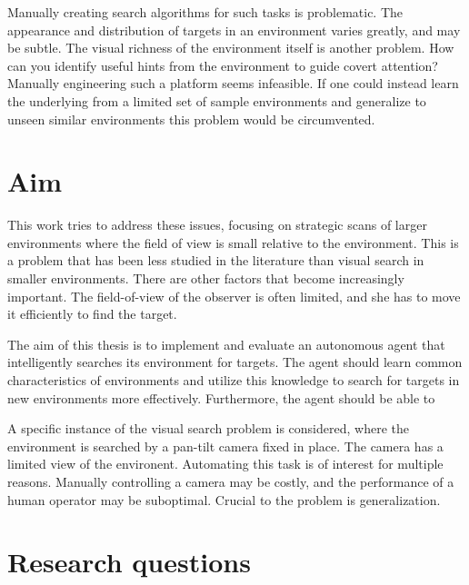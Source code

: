 Manually creating search algorithms for such tasks is problematic. The appearance and distribution of targets in an environment varies greatly, and may be subtle. The visual richness of the environment itself is another problem. How can you identify useful hints from the environment to guide covert attention? Manually engineering such a platform seems infeasible. If one could instead learn the underlying from a limited set of sample environments and generalize to unseen similar environments this problem would be circumvented.





\section{Aim}
\label{sec:aim}

This work tries to address these issues, focusing on strategic scans of larger environments where the field of view is small relative to the environment. This is a problem that has been less studied in the literature than visual search in smaller environments. There are other factors that become increasingly important. The field-of-view of the observer is often limited, and she has to move it efficiently to find the target.

The aim of this thesis is to implement and evaluate an autonomous agent that intelligently searches its environment for targets. The agent should learn common characteristics of environments and utilize this knowledge to search for targets in new environments more effectively. Furthermore, the agent should be able to 

A specific instance of the visual search problem is considered, where the environment is searched by a pan-tilt camera fixed in place. The camera has a limited view of the environent. Automating this task is of interest for multiple reasons. Manually controlling a camera may be costly, and the performance of a human operator may be suboptimal. Crucial to the problem is generalization.

\section{Research questions}
\label{sec:research-questions}

